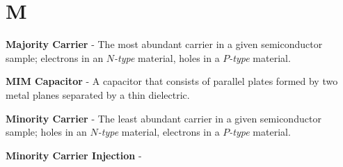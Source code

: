 \section{M}
    \textbf{Majority Carrier} - The most abundant carrier in a given semiconductor sample; electrons in an $N$\emph{-type} material, holes in a $P$\emph{-type} material.

\vspace{0.5cm}
\noindent
    \textbf{MIM Capacitor} - A capacitor that consists of parallel plates formed by two metal planes separated by a thin dielectric.

\vspace{0.5cm}
\noindent
    \textbf{Minority Carrier} - The least abundant carrier in a given semiconductor sample; holes in an $N$\emph{-type} material, electrons in a $P$\emph{-type} material.

\vspace{0.5cm}
\noindent
    \textbf{Minority Carrier Injection} -

